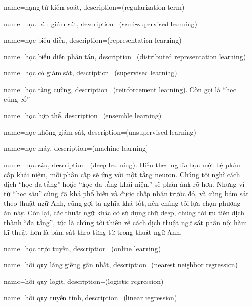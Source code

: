 {
    name={hạng tử kiểm soát},
    description={(regularization term)}
}

{
    name={học bán giám sát},
    description={(semi-supervised learning)}
}

{
    name={học biểu diễn},
    description={(representation learning)}
}

{
    name={học biểu diễn phân tán},
    description={(distributed representation learning)}
}

{
    name={học có giám sát},
    description={(supervised learning)}
}

{
    name={học tăng cường},
    description={(reinforcement learning). Còn gọi là ``học củng cố''}
}

{
    name={học hợp thể},
    description={(ensemble learning)}
}

{
    name={học không giám sát},
    description={(unsupervised learning)}
}

{
    name={học máy},
    description={(machine learning)}
}

{
    name={học sâu},
    description={(deep learning). Hiểu theo nghĩa học một
    hệ phân cấp khái niệm, mỗi phân cấp sẽ ứng với một tầng neuron.
    Chúng tôi nghĩ cách dịch ``học đa tầng'' hoặc
    ``học đa tầng khái niệm'' sẽ phản ánh rõ hơn. Nhưng vì từ
    ``học sâu'' cũng đã khá phổ biến và được chấp nhận trước đó,
    và cũng bám sát theo thuật ngữ Anh, cũng gợi tả nghĩa khá tốt,
    nên chúng tôi lựa chọn phương án này. Còn lại, các thuật ngữ khác
    có sử dụng chữ deep, chúng tôi ưu tiên dịch thành ``đa tầng'',
    tức là chúng tôi thiên về cách dịch thuật ngữ sát phần nội hàm kĩ thuật
    hơn là bám sát theo từng từ trong thuật ngữ Anh.}
}

{
    name={học trực tuyến},
    description={(online learning)}
}

{
    name={hồi quy láng giềng gần nhất},
    description={(nearest neighbor regression)}
}

{
    name={hồi quy logit},
    description={(logistic regression)}
}

{
    name={hồi quy tuyến tính},
    description={(linear regression)}
}


